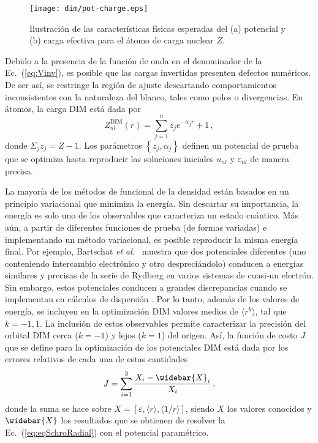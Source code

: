 \begin{figure}[t]
\centering
\texttt{[image: dim/pot-charge.eps]}
\caption[Características físicas del potencial y carga efectiva.]
{Ilustración de las características físicas esperadas del (a) potencial 
y (b) carga efectiva para el átomo de carga nuclear $Z$.}
\label{fig:potycharge}
\end{figure}

Debido a la presencia de la función de onda en el denominador de la 
Ec.~(\ref{eq:Vinv}), es posible que las cargas invertidas presenten 
defectos numéricos. De ser así, se restringe la región de ajuste 
descartando comportamientos inconsistentes con la naturaleza del blanco,
tales como polos o divergencias. En átomos, la carga DIM está dada por
\begin{equation}
Z_{nl}^{\mathrm{DIM}}(r)= \sum_{j=1}^{n} z_j e^{-\alpha_j r}+1 \,,
\label{eq:atomzDIM}
\end{equation}
donde $\Sigma_j z_j=Z-1$. Los parámetros $\left\{z_j,\alpha_j\right\}$ 
definen un potencial de prueba que se optimiza hasta reproducir las 
soluciones iniciales $u_{nl}$ y $\varepsilon_{nl}$ de manera precisa. 

La mayoría de los métodos de funcional de la densidad están basados en 
un principio variacional que minimiza la energía. Sin 
descartar su importancia, la energía es solo uno de los observables que 
caracteriza un estado cuántico. Más aún, a partir de diferentes 
funciones de prueba (de formas variadas) e implementando un método 
variacional, es posible reproducir la misma energía final. Por ejemplo, 
Bartschat \textit{et al.}~\cite{Albright:93,Bartschat:96} muestra que 
dos potenciales diferentes (uno conteniendo intercambio electrónico y 
otro despreciándolo) conducen a energías similares y precisas de la 
serie de Rydberg en varios sistemas de cuasi-un electrón. Sin embargo, 
estos potenciales conducen a grandes discrepancias cuando se implementan 
en cálculos de dispersión \cite{BartschatBray:96}. Por lo tanto, además 
de los valores de energía, se incluyen en la optimización DIM valores 
medios de $\langle r^k \rangle$, tal que $k=-1,1$. La inclusión de estos 
observables permite caracterizar la precisión del orbital DIM cerca 
($k=-1$) y lejos ($k=1$) del origen. Así, la función de costo $J$ que se 
define para la optimización de los potenciales DIM está dada por los 
errores relativos de cada una de estas cantidades
\begin{equation}
J=\sum_{i=1}^3 \frac{X_i-\widebar{X}_i}{X_i}\,,
\label{eq:fncosto-dim}
\end{equation}
donde la suma se hace sobre 
$X=\left[\varepsilon,\langle r \rangle,\langle 1/r \rangle\right]$, 
siendo $X$ los valores conocidos y $\widebar{X}$ los resultados que se 
obtienen de resolver la Ec.~(\ref{eq:eqSchroRadial}) con el potencial 
paramétrico. 

